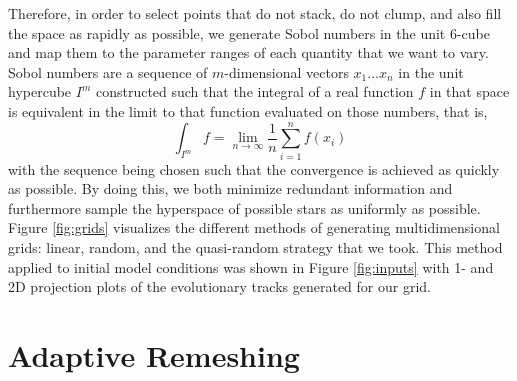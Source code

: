 \documentclass[manuscript]{aastex}
\begin{document}
Therefore, in order to select points that do not stack, do not clump, and also fill the space as rapidly as possible, we generate Sobol numbers \citep{sobol1967distribution} in the unit 6-cube and map them to the parameter ranges of each quantity that we want to vary. Sobol numbers are a sequence of $m$-dimensional vectors $x_1 \ldots x_n$ in the unit hypercube $I^m$ constructed such that the integral of a real function $f$ in that space is equivalent in the limit to that function evaluated on those numbers, that is,
\begin{equation}
    \int_{I^m} f = \lim_{n \to \infty} \frac{1}{n}\sum_{i=1}^n f(x_i)
\end{equation}
with the sequence being chosen such that the convergence is achieved as quickly as possible. By doing this, we both minimize redundant information and furthermore sample the hyperspace of possible stars as uniformly as possible. Figure \ref{fig:grids} visualizes the different methods of generating multidimensional grids: linear, random, and the quasi-random strategy that we took. This method applied to initial model conditions was shown in Figure \ref{fig:inputs} with 1- and 2D projection plots of the evolutionary tracks generated for our grid. 

\begin{figure*}
    \centering
    \caption{Results of different methods for generating multidimensional grids portrayed via a unit cube projected onto a unit square. Linear (left), random (middle), and quasi-random (right) grids are generated in three dimensions, with color depicting the third dimension, i.e., the distance between the reader and the screen. From top to bottom, all three methods are shown with 100, 400, and 2000 points generated, respectively. }%
    \label{fig:grids}
\end{figure*}


\section{Adaptive Remeshing}
\label{sec:remeshing}
\end{document}
